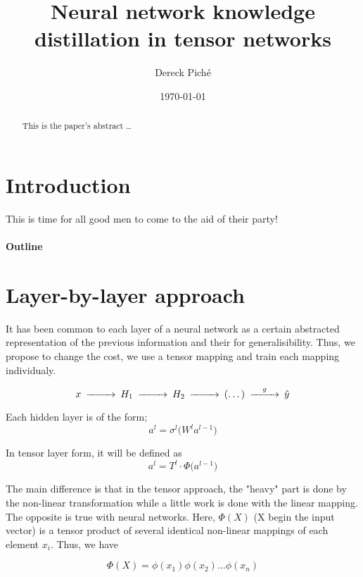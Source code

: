 \documentclass[11pt]{article}
\title{Neural network knowledge distillation in tensor networks}
\author{Dereck Piché}
\date{\today}
\begin{document}
\maketitle

\begin{abstract}
This is the paper's abstract \ldots
\end{abstract}

\section{Introduction}
This is time for all good men to come to the aid of their party!

\paragraph{Outline}


\section{Layer-by-layer approach}
It has been common to each layer of a neural network as a certain abstracted representation of the previous information and their for generalisibility. Thus, we propose to change the cost, we use a tensor mapping and train each mapping individualy.

\begin{equation*}
\begin{CD}
    x @>>>H_1 @>>>H_2 @>>>(\dots)@>g>> \hat{y}
\end{CD}
\end{equation*}

Each hidden layer is of the form;
\begin{equation*}
    a^l = \sigma^l \bigl( W^l a^{l-1} \bigr)
\end{equation*}

In tensor layer form, it will be defined as 
\begin{equation*}
    a^l = T^l \cdot \Phi \bigl( a^{l-1} \bigr)
\end{equation*}

The main difference is that in the tensor approach, the "heavy" part is done by the non-linear transformation while a little work is done with the linear mapping. The opposite is true with neural networks. Here, $\Phi(X)$ (X begin the input vector) is a tensor product of several identical non-linear mappings of each element $x_i$. Thus, we have 

\begin{equation*}
    \Phi(X) = \phi(x_1)\phi(x_2)\dots\phi(x_n)
\end{equation*}
\end{document}
